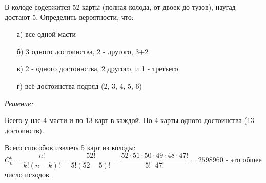 В колоде содержится 52 карты (полная колода, от двоек до тузов), наугад достают 5. Определить вероятности, что:
\begin{enumerate}
	\item[а)] все одной масти
	\item[б)] 3 одного достоинства, 2 - другого, 3+2
	\item[в)] 2 - одного достоинства, 2 другого, и 1 - третьего
	\item[г)] всё достоинства подряд (2, 3, 4, 5, 6)
\end{enumerate}

\textit{Решение:}

\begin{remark}
	Всего у нас 4 масти и по 13 карт в каждой. По 4 карты одного достоинства (13 достоинств).
\end{remark}

Всего способов извлечь 5 карт из колоды: $C_n^k = \dfrac{n!}{k!(n-k)!} = \dfrac{52!}{5!(52-5)!} = \dfrac{52 \cdot 51 \cdot 50 \cdot 49 \cdot 48 \cdot 47!}{5! \cdot 47!} = 2598960$ - это общее число исходов.

